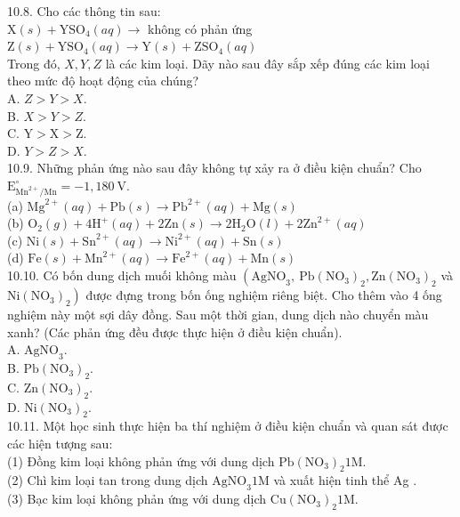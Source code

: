 \documentclass[10pt]{article}
\begin{document}
10.8. Cho các thông tin sau:\\
$\mathrm{X}(s)+\mathrm{YSO}_{4}(a q) \rightarrow$ không có phản ứng\\
$\mathrm{Z}(s)+\mathrm{YSO}_{4}(a q) \rightarrow \mathrm{Y}(s)+\mathrm{ZSO}_{4}(a q)$\\
Trong đó, $X, Y, Z$ là các kim loại. Dãy nào sau đây sắp xếp đúng các kim loại theo mức độ hoạt động của chúng?\\
A. $Z>Y>X$.\\
B. $X>Y>Z$.\\
C. $\mathrm{Y}>\mathrm{X}>\mathrm{Z}$.\\
D. $Y>Z>X$.\\
10.9. Những phản ứng nào sau đây không tự xảy ra ở điều kiện chuẩn? Cho $\mathrm{E}_{\mathrm{Mn}^{2+} / \mathrm{Mn}}^{\circ}=-1,180 \mathrm{~V}$.\\
(a) $\mathrm{Mg}^{2+}(a q)+\mathrm{Pb}(s) \rightarrow \mathrm{Pb}^{2+}(a q)+\mathrm{Mg}(s)$\\
(b) $\mathrm{O}_{2}(g)+4 \mathrm{H}^{+}(a q)+2 \mathrm{Zn}(s) \rightarrow 2 \mathrm{H}_{2} \mathrm{O}(l)+2 \mathrm{Zn}^{2+}(a q)$\\
(c) $\mathrm{Ni}(s)+\mathrm{Sn}^{2+}(a q) \rightarrow \mathrm{Ni}^{2+}(a q)+\mathrm{Sn}(s)$\\
(d) $\mathrm{Fe}(s)+\mathrm{Mn}^{2+}(a q) \rightarrow \mathrm{Fe}^{2+}(a q)+\mathrm{Mn}(s)$\\
10.10. Có bốn dung dịch muối không màu $\left(\mathrm{AgNO}_{3}, \mathrm{~Pb}\left(\mathrm{NO}_{3}\right)_{2}, \mathrm{Zn}\left(\mathrm{NO}_{3}\right)_{2}\right.$ và $\left.\mathrm{Ni}\left(\mathrm{NO}_{3}\right)_{2}\right)$ được đựng trong bốn ống nghiệm riêng biệt. Cho thêm vào 4 ống nghiệm này một sợi dây đồng. Sau một thời gian, dung dịch nào chuyển màu xanh? (Các phản ứng đều được thực hiện ở điều kiện chuẩn).\\
A. $\mathrm{AgNO}_{3}$.\\
B. $\mathrm{Pb}\left(\mathrm{NO}_{3}\right)_{2}$.\\
C. $\mathrm{Zn}\left(\mathrm{NO}_{3}\right)_{2}$.\\
D. $\mathrm{Ni}\left(\mathrm{NO}_{3}\right)_{2}$.\\
10.11. Một học sinh thực hiện ba thí nghiệm ở điều kiện chuẩn và quan sát được các hiện tượng sau:\\
(1) Đồng kim loại không phản ứng với dung dịch $\mathrm{Pb}\left(\mathrm{NO}_{3}\right)_{2} 1 \mathrm{M}$.\\
(2) Chì kim loại tan trong dung dịch $\mathrm{AgNO}_{3} 1 \mathrm{M}$ và xuất hiện tinh thể Ag .\\
(3) Bạc kim loại không phản ứng với dung dịch $\mathrm{Cu}\left(\mathrm{NO}_{3}\right)_{2} 1 \mathrm{M}$.
\end{document}
